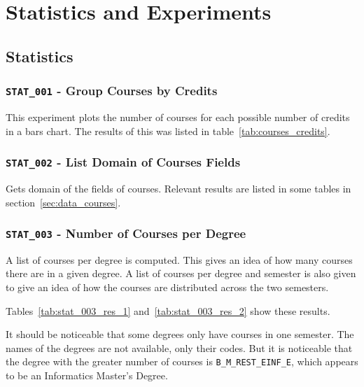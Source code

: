 \chapter{Statistics and Experiments}

\section{Statistics}

\subsection{\texttt{STAT\_001} - Group Courses by Credits}

This experiment plots the number of courses for each possible number of credits
in a bars chart. The results of this was listed in
table~\ref{tab:courses_credits}.

\subsection{\texttt{STAT\_002} - List Domain of Courses Fields}

Gets domain of the fields of courses. Relevant results are listed in some
tables in section~\ref{sec:data_courses}.

\subsection{\texttt{STAT\_003} - Number of Courses per Degree}

A list of courses per degree is computed. This gives an idea of how many
courses there are in a given degree. A list of courses per degree and semester
is also given to give an idea of how the courses are distributed across the two
semesters.

Tables~\ref{tab:stat_003_res_1} and~\ref{tab:stat_003_res_2} show these results.

It should be noticeable that some degrees only have courses in one semester.
The names of the degrees are not available, only their codes. But it is
noticeable that the degree with the greater number of courses is
\texttt{B\_M\_REST\_EINF\_E}, which appears to be an Informatics Master's
Degree.

